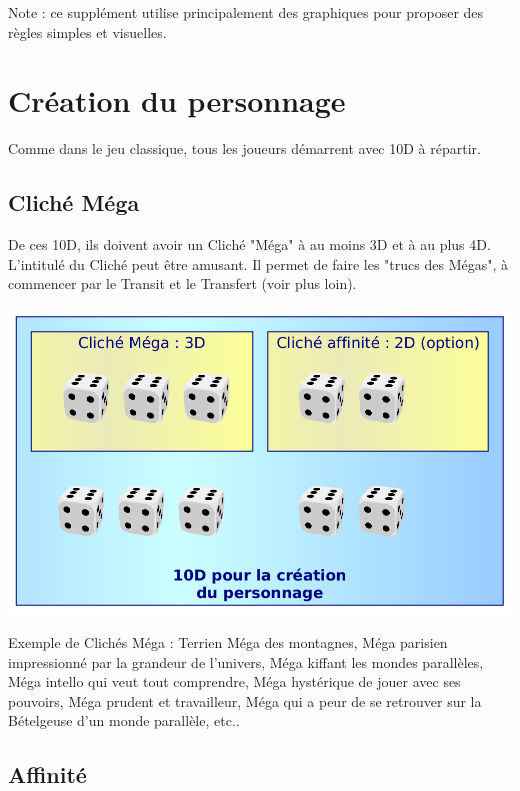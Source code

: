 \documentclass[11pt]{article}
\begin{document}
Note : ce supplément utilise principalement des graphiques pour proposer des règles simples et visuelles.

\tableofcontents

\newpage
\pagestyle{fancy}

\section{Création du personnage}

Comme dans le jeu classique, tous les joueurs démarrent avec 10D à répartir. 

\subsection{Cliché Méga}

De ces 10D, ils doivent avoir un Cliché "Méga" à au moins 3D et à au plus 4D. L'intitulé du Cliché peut être amusant. Il permet de faire les "trucs des Mégas", à commencer par le Transit et le Transfert (voir plus loin).

\begin{center}
\includegraphics[scale=0.28]{01-creation-perso}
\end{center}

Exemple de Clichés Méga : Terrien Méga des montagnes, Méga parisien impressionné par la grandeur de l'univers, Méga kiffant les mondes parallèles, Méga intello qui veut tout comprendre, Méga hystérique de jouer avec ses pouvoirs, Méga prudent et travailleur, Méga qui a peur de se retrouver sur la Bételgeuse d'un monde parallèle, etc.. 

\subsection{Affinité}
\end{document}
